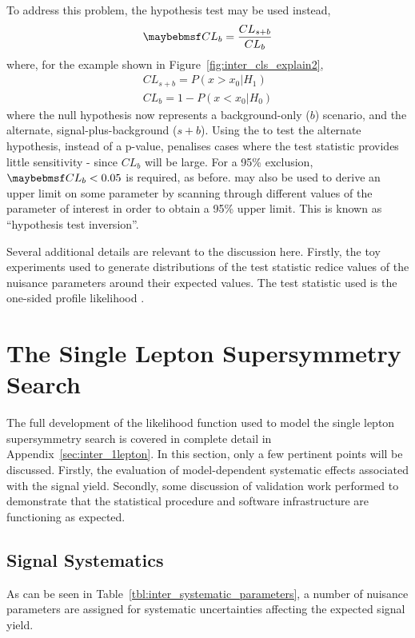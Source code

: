 To address this problem, the \CLs hypothesis test may be used instead,
\begin{equation*}
\CLs = \frac{CL_{s+b}}{CL_{b}}
\end{equation*}
where, for the example shown in Figure~\ref{fig:inter_cls_explain2},
\begin{eqnarray*}
CL_{s+b} = P\left(x > x_0 | H_1\right)\\
CL_b = 1 - P\left(x < x_0 | H_0\right)
\end{eqnarray*}
where the null hypothesis now represents a background-only ($b$) scenario, and
the alternate, signal-plus-background ($s+b$). Using the \CLs to test the
alternate hypothesis, instead of a p-value, penalises cases where the test
statistic provides little sensitivity - since $CL_b$ will be large. For a 95\%
exclusion, $\CLs < 0.05$ is required, as before. \CLs may also be used to derive
an upper limit on some parameter by scanning through different values of the
parameter of interest in order to obtain a 95\% upper limit. This is known as
``hypothesis test inversion''.

Several additional details are relevant to the discussion here. Firstly, the toy
experiments used to generate distributions of the test statistic redice values
of the nuisance parameters around their expected values. The test statistic used
is the one-sided profile likelihood \cite{cl_computation, modified_frequentist, atlas_cms_higgs}.

\section{The Single Lepton Supersymmetry Search}
The full development of the likelihood function used to model the single lepton
supersymmetry search is covered in complete detail in
Appendix~\ref{sec:inter_1lepton}. In this section, only a few pertinent points
will be discussed. Firstly, the evaluation of model-dependent systematic effects
associated with the signal yield. Secondly, some discussion of validation work
performed to demonstrate that the statistical procedure and software
infrastructure are functioning as expected.

\subsection{Signal Systematics}
As can be seen in Table~\ref{tbl:inter_systematic_parameters}, a number of
nuisance parameters are assigned for systematic uncertainties affecting the
expected signal yield.

